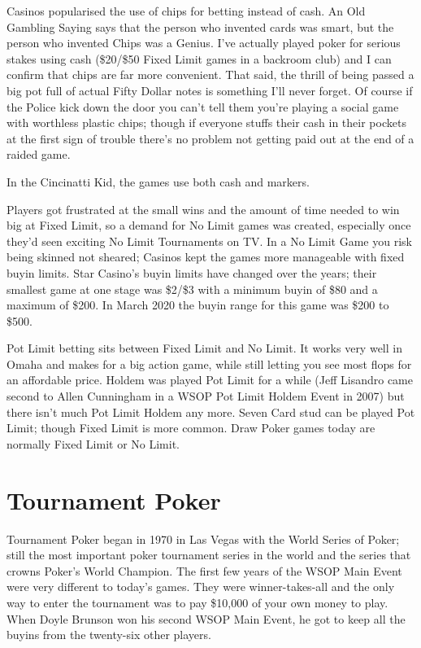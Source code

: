 Casinos popularised the use of chips for betting instead of cash.
An Old Gambling Saying says that the person who invented cards was
smart, but the person who invented Chips was a Genius. I've actually
played poker for serious stakes using cash (\$20/\$50 Fixed Limit
games in a backroom club) and I can confirm that chips are far more
convenient. That said, the thrill of being passed a big pot full of
actual Fifty Dollar notes is something I'll never forget. Of course if
the Police kick down the door you can't tell them you're playing
a social game with worthless plastic chips; though if everyone stuffs
their cash in their pockets at the first sign of trouble there's no
problem not getting paid out at the end of a raided game.

In the Cincinatti Kid, the games use both cash and markers.


Players got frustrated at the small wins and the amount of time needed
to win big at Fixed Limit, so a demand for No Limit games was created,
especially once they'd seen exciting No Limit Tournaments on TV.
In a No Limit Game you risk being skinned not sheared; Casinos kept
the games more manageable with fixed buyin limits. Star Casino's buyin limits
have changed over the years; their smallest game at one stage was
\$2/\$3 with a minimum buyin of \$80 and a maximum of \$200. In March 2020
the buyin range for this game was \$200 to \$500.

Pot Limit betting sits between Fixed Limit and No Limit. It works very
well in Omaha and makes for a big action game, while still letting you
see most flops for an affordable price. Holdem was played Pot Limit for
a while (Jeff Lisandro came second to Allen Cunningham in a WSOP Pot Limit
Holdem Event in 2007) but there isn't much Pot Limit Holdem any more.
Seven Card stud can be played Pot Limit; though Fixed Limit
is more common. Draw Poker games today are normally Fixed Limit or No Limit.

\section{Tournament Poker}

Tournament Poker began in 1970 in Las Vegas with the World Series of
Poker; still the most important poker tournament series in the world
and the series that crowns Poker's World Champion. The first few years
of the WSOP Main Event were very different to today's games.
They were winner-takes-all and the only way to enter the
tournament was to pay \$10,000 of your own money to play.
When Doyle Brunson won his second WSOP Main Event, he got to keep
all the buyins from the twenty-six other players.

